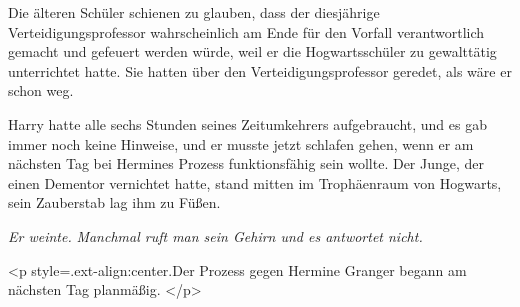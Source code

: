 Die älteren Schüler schienen zu glauben, dass der diesjährige
Verteidigungsprofessor wahrscheinlich am Ende für den Vorfall verantwortlich
gemacht und gefeuert werden würde, weil er die Hogwartsschüler zu gewalttätig
unterrichtet hatte. Sie hatten über den Verteidigungsprofessor geredet, als wäre
er schon weg.

Harry hatte alle sechs Stunden seines Zeitumkehrers aufgebraucht, und es gab
immer noch keine Hinweise, und er musste jetzt schlafen gehen, wenn er am
nächsten Tag bei Hermines Prozess funktionsfähig sein wollte. Der Junge, der
einen Dementor vernichtet hatte, stand mitten im Trophäenraum von Hogwarts, sein
Zauberstab lag ihm zu Füßen.

\emph{Er weinte.}
\emph{Manchmal ruft man sein Gehirn und es antwortet nicht.}

<p style=\grqq{}.ext-align:center\grqq{}.Der Prozess gegen Hermine Granger
begann am nächsten Tag planmäßig. </p>

